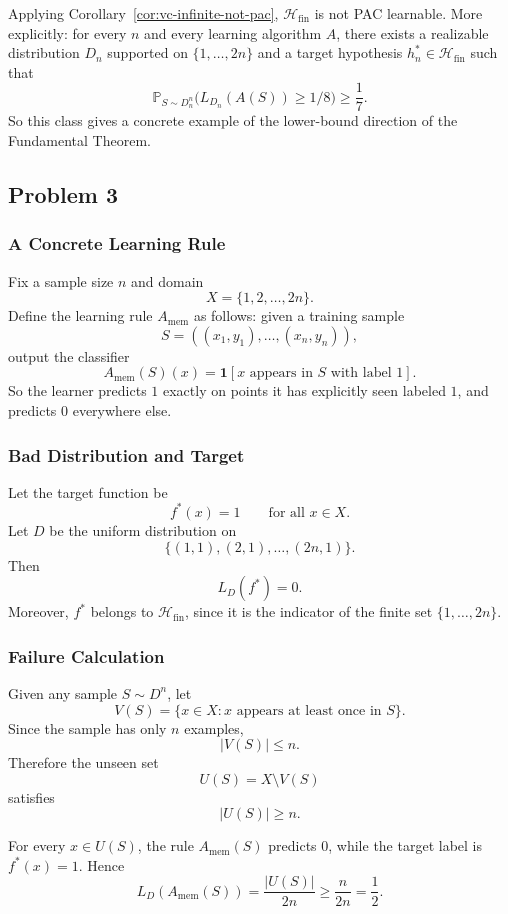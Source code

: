\documentclass{article}
\theoremstyle{definition}
\theoremstyle{remark}
\newcommand{\PP}{\mathbb{P}}
\newcommand{\cH}{\mathcal{H}}
\newcommand{\ind}{\mathbf{1}}
\begin{document}
Applying Corollary~\ref{cor:vc-infinite-not-pac}, $\cH_{\mathrm{fin}}$ is not PAC learnable. More explicitly: for every $n$ and every learning algorithm $A$, there exists a realizable distribution $D_n$ supported on $\{1,\dots,2n\}$ and a target hypothesis $h_n^*\in \cH_{\mathrm{fin}}$ such that
$$
\PP_{S\sim D_n^n}\bigl(L_{D_n}(A(S))\ge 1/8\bigr)\ge \frac{1}{7}.
$$
So this class gives a concrete example of the lower-bound direction of the Fundamental Theorem.

\subsection{Problem 3}

\subsubsection{A Concrete Learning Rule}

Fix a sample size $n$ and domain
$$
X=\{1,2,\dots,2n\}.
$$
Define the learning rule $A_{\mathrm{mem}}$ as follows: given a training sample
$$
S=((x_1,y_1),\dots,(x_n,y_n)),
$$
output the classifier
$$
A_{\mathrm{mem}}(S)(x)
=
\ind[\text{$x$ appears in $S$ with label $1$}].
$$
So the learner predicts $1$ exactly on points it has explicitly seen labeled $1$, and predicts $0$ everywhere else.

\subsubsection{Bad Distribution and Target}

Let the target function be
$$
f^*(x)=1
\qquad \text{for all } x\in X.
$$
Let $D$ be the uniform distribution on
$$
\{(1,1),(2,1),\dots,(2n,1)\}.
$$
Then
$$
L_D(f^*)=0.
$$
Moreover, $f^*$ belongs to $\cH_{\mathrm{fin}}$, since it is the indicator of the finite set $\{1,\dots,2n\}$.

\subsubsection{Failure Calculation}

Given any sample $S\sim D^n$, let
$$
V(S)=\{x\in X : x \text{ appears at least once in } S\}.
$$
Since the sample has only $n$ examples,
$$
|V(S)|\le n.
$$
Therefore the unseen set
$$
U(S)=X\setminus V(S)
$$
satisfies
$$
|U(S)|\ge n.
$$

For every $x\in U(S)$, the rule $A_{\mathrm{mem}}(S)$ predicts $0$, while the target label is $f^*(x)=1$. Hence
$$
L_D(A_{\mathrm{mem}}(S))
=
\frac{|U(S)|}{2n}
\ge
\frac{n}{2n}
=
\frac{1}{2}.
$$
\end{document}
